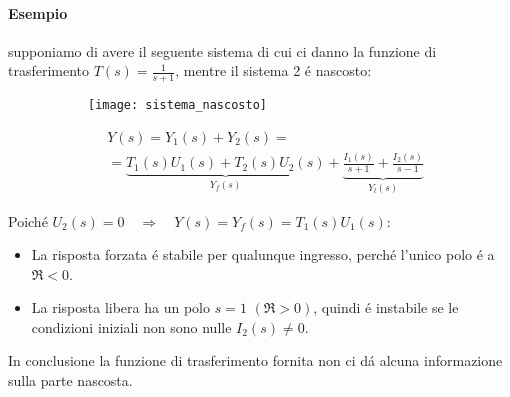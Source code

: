 \documentclass[../main.tex]{subfiles}
\begin{document}
	\paragraph{Esempio} supponiamo di avere il seguente sistema di cui ci danno la funzione di trasferimento $ T(s) = \frac{1}{s+1} $, mentre il sistema 2 \'e nascosto:\\
	\begin{figure}[h!]
		\begin{subfigure}{0.5\textwidth}
			\texttt{[image: sistema\_nascosto]}
		\end{subfigure}
		\begin{subfigure}{0.5\textwidth}
			\begin{align*}
				&Y(s) = Y_1(s) + Y_2(s) =\\
				&= \underbrace{T_1(s)U_1(s) + T_2(s)U_2(s)}_{Y_f(s)} + \underbrace{\frac{I_1(s)}{s+1} + \frac{I_2(s)}{s-1}}_{Y_l(s)}
			\end{align*}
		\end{subfigure}
	\end{figure}
	\newpage\noindent
	Poich\'e $ U_2(s) = 0 \quad \Rightarrow \quad Y(s) = Y_f(s) = T_1(s)U_1(s)$:
	\begin{itemize}
		\item La risposta forzata \'e stabile per qualunque ingresso, perch\'e l'unico polo \'e a $ \Re < 0 $.
		\item La risposta libera ha un polo $ s = 1 $ $ (\Re > 0) $, quindi \'e instabile se le condizioni iniziali non sono nulle $ I_2(s) \neq 0 $.
	\end{itemize}
	In conclusione la funzione di trasferimento fornita non ci d\'a alcuna informazione sulla parte nascosta.\\ 
\end{document}
